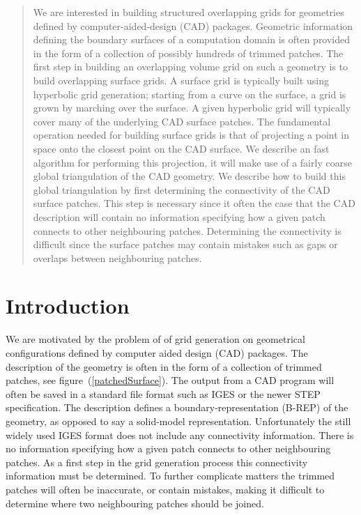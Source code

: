 \documentclass[11pt]{article}
\begin{document}
\begin{abstract}
  We are interested in building structured overlapping grids for
geometries defined by computer-aided-design (CAD) packages.  Geometric
information defining the boundary surfaces of a computation domain is
often provided in the form of a collection of possibly hundreds of
trimmed patches. The first step in building an overlapping volume grid
on such a geometry is to build overlapping surface grids. A surface
grid is typically built using hyperbolic grid generation; starting
from a curve on the surface, a grid is grown by marching over the
surface. A given hyperbolic grid will typically cover many of the
underlying CAD surface patches. The fundamental operation needed for
building surface grids is that of projecting a point in space
onto the closest point on the CAD surface. We describe an fast
algorithm for performing this projection, it will make use of a fairly
coarse global triangulation of the CAD geometry. We describe how to
build this global triangulation by first determining the connectivity
of the CAD surface patches.  This step is necessary since it often the
case that the CAD description will contain no information specifying
how a given patch connects to other neighbouring patches. Determining
the connectivity is difficult since the surface patches may contain
mistakes such as gaps or overlaps between neighbouring patches.

\end{abstract}



\clearpage
\section{Introduction}

   We are motivated by the problem of of grid generation on
geometrical configurations defined by computer aided design (CAD)
packages. The description of the geometry is often in the form
of a collection of trimmed patches, see figure~(\ref{patchedSurface}).
The output from a CAD program will often be saved in a standard file
format such as IGES or the newer STEP specification. The description
defines a boundary-representation (B-REP) of the geometry, as opposed
to say a solid-model representation. Unfortunately the still widely
used IGES format does not include any connectivity information. There
is no information specifying how a given patch connects to other
neighbouring patches. As a first step in the grid generation process
this connectivity information must be determined. To further
complicate matters the trimmed patches will often be inaccurate, or
contain mistakes, making it difficult to determine where two
neighbouring patches should be joined.
\end{document}
